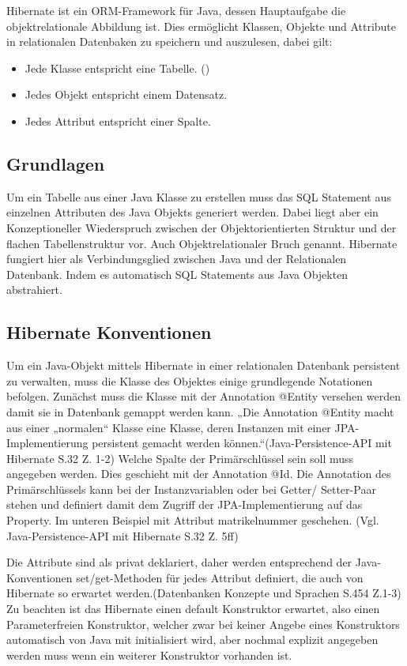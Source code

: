 Hibernate ist ein ORM-Framework für Java, dessen Hauptaufgabe die objektrelationale Abbildung ist. Dies ermöglicht Klassen, Objekte und Attribute in relationalen Datenbaken zu speichern und auszulesen, dabei gilt:

\begin{itemize}
	\item Jede Klasse entspricht eine Tabelle. (\cite{Max1})
	\item Jedes Objekt entspricht einem Datensatz.
	\item Jedes Attribut entspricht einer Spalte.
\end{itemize}

\subsection{Grundlagen}

Um ein Tabelle aus einer Java Klasse zu erstellen muss das SQL Statement aus einzelnen Attributen des Java Objekts generiert werden. Dabei liegt aber ein Konzeptioneller Wiederspruch zwischen der Objektorientierten Struktur und der flachen Tabellenstruktur vor. Auch Objektrelationaler Bruch genannt. Hibernate fungiert hier als Verbindungsglied zwischen Java und der Relationalen Datenbank. Indem es automatisch SQL Statements aus Java Objekten abstrahiert.


\subsection{Hibernate Konventionen}

Um ein Java-Objekt mittels Hibernate in einer relationalen Datenbank persistent zu verwalten, muss die Klasse des Objektes einige grundlegende Notationen befolgen. Zunächst muss die Klasse mit der Annotation @Entity versehen werden damit sie in Datenbank gemappt werden kann. „Die Annotation @Entity macht aus einer „normalen“ Klasse eine Klasse, deren Instanzen mit einer JPA-Implementierung persistent gemacht werden können.“(Java-Persistence-API mit Hibernate S.32 Z. 1-2) Welche Spalte der Primärschlüssel sein soll muss angegeben werden. Dies geschieht mit der Annotation @Id. Die Annotation des Primärschlüssels kann bei der Instanzvariablen oder bei Getter/ Setter-Paar stehen und definiert damit dem Zugriff der JPA-Implementierung auf das Property. Im unteren Beispiel mit Attribut matrikelnummer geschehen. (Vgl. Java-Persistence-API mit Hibernate S.32 Z. 5ff)

Die Attribute sind als privat deklariert, daher werden entsprechend der Java-Konventionen set/get-Methoden für jedes Attribut definiert, die auch von Hibernate so erwartet werden.(Datenbanken Konzepte und Sprachen S.454 Z.1-3) Zu beachten ist das Hibernate einen default Konstruktor erwartet, also einen Parameterfreien Konstruktor, welcher zwar bei keiner Angebe eines Konstruktors automatisch von Java mit initialisiert wird, aber nochmal explizit angegeben werden muss wenn ein weiterer Konstruktor vorhanden ist.

